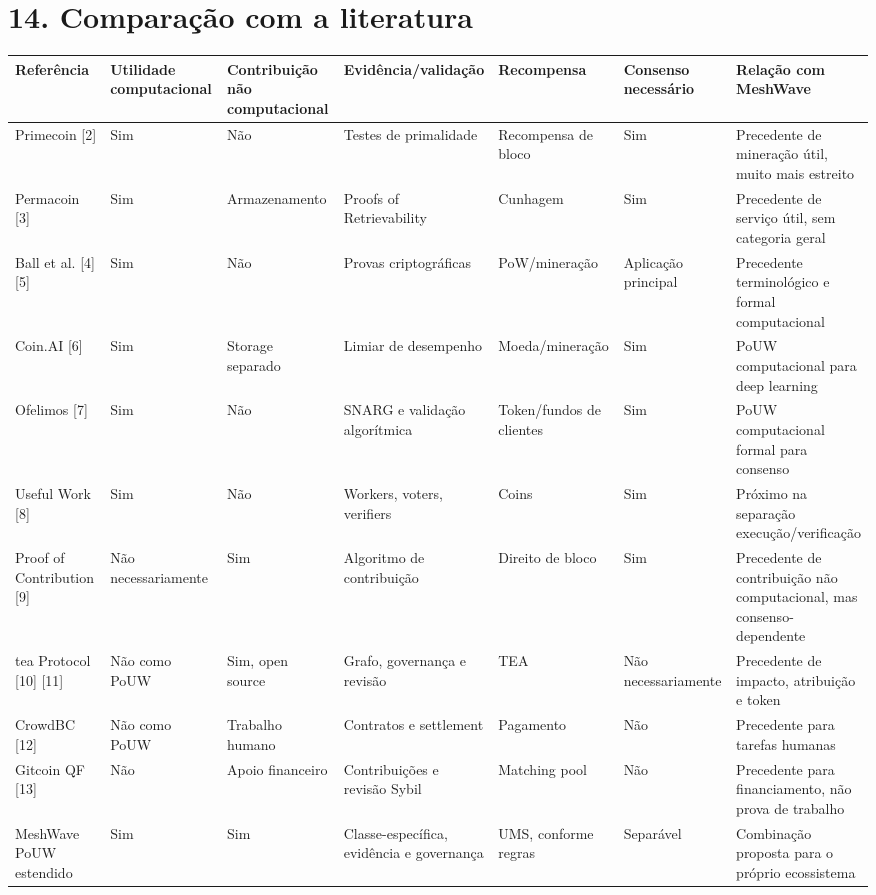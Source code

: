 \documentclass[12pt,a4paper]{article}
\begin{document}
\section{14. Comparação com a literatura}

\begin{center}
\small
\begin{longtable}{p{0.17\linewidth} p{0.17\linewidth} p{0.17\linewidth} p{0.17\linewidth} p{0.17\linewidth} p{0.17\linewidth} p{0.17\linewidth}}
\toprule
Referência & Utilidade computacional & Contribuição não computacional & Evidência/validação & Recompensa & Consenso necessário & Relação com MeshWave \\
\midrule\endhead
Primecoin [2] & Sim & Não & Testes de primalidade & Recompensa de bloco & Sim & Precedente de mineração útil, muito mais estreito \\
Permacoin [3] & Sim & Armazenamento & Proofs of Retrievability & Cunhagem & Sim & Precedente de serviço útil, sem categoria geral \\
Ball et al. [4] [5] & Sim & Não & Provas criptográficas & PoW/mineração & Aplicação principal & Precedente terminológico e formal computacional \\
Coin.AI [6] & Sim & Storage separado & Limiar de desempenho & Moeda/mineração & Sim & PoUW computacional para deep learning \\
Ofelimos [7] & Sim & Não & SNARG e validação algorítmica & Token/fundos de clientes & Sim & PoUW computacional formal para consenso \\
Useful Work [8] & Sim & Não & Workers, voters, verifiers & Coins & Sim & Próximo na separação execução/verificação \\
Proof of Contribution [9] & Não necessariamente & Sim & Algoritmo de contribuição & Direito de bloco & Sim & Precedente de contribuição não computacional, mas consenso-dependente \\
tea Protocol [10] [11] & Não como PoUW & Sim, open source & Grafo, governança e revisão & TEA & Não necessariamente & Precedente de impacto, atribuição e token \\
CrowdBC [12] & Não como PoUW & Trabalho humano & Contratos e settlement & Pagamento & Não & Precedente para tarefas humanas \\
Gitcoin QF [13] & Não & Apoio financeiro & Contribuições e revisão Sybil & Matching pool & Não & Precedente para financiamento, não prova de trabalho \\
MeshWave PoUW estendido & Sim & Sim & Classe-específica, evidência e governança & UMS, conforme regras & Separável & Combinação proposta para o próprio ecossistema \\
\bottomrule
\end{longtable}
\end{center}
\end{document}
